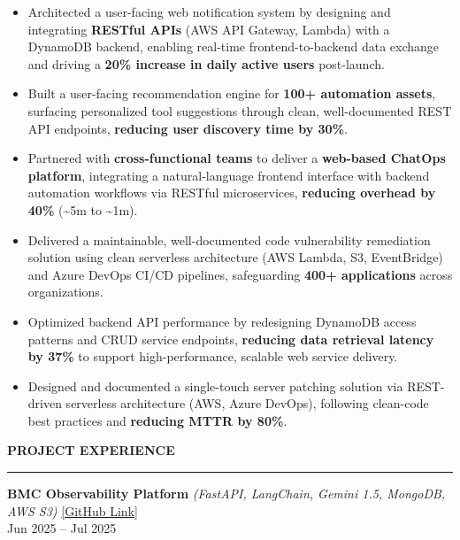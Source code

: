 \documentclass[letterpaper,10.5pt]{extarticle}
\newcommand{\resumesection}[1]{%
    \vspace{6pt}%
    \noindent\textbf{#1}\vspace{-5pt}%
    \\\noindent\rule{\textwidth}{0.5pt}%
    \vspace{1pt}%
}
\begin{document}
\begin{itemize}[leftmargin=12pt, topsep=1pt, itemsep=0pt, parsep=0pt]
    \item Architected a user-facing web notification system by designing and integrating \textbf{RESTful APIs} (AWS API Gateway, Lambda) with a DynamoDB backend, enabling real-time frontend-to-backend data exchange and driving a \textbf{20\% increase in daily active users} post-launch.
    \item Built a user-facing recommendation engine for \textbf{100+ automation assets}, surfacing personalized tool suggestions through clean, well-documented REST API endpoints, \textbf{reducing user discovery time by 30\%}.
    \item Partnered with \textbf{cross-functional teams} to deliver a \textbf{web-based ChatOps platform}, integrating a natural-language frontend interface with backend automation workflows via RESTful microservices, \textbf{reducing overhead by 40\%} (\textasciitilde5m to \textasciitilde1m).
    \item Delivered a maintainable, well-documented code vulnerability remediation solution using clean serverless architecture (AWS Lambda, S3, EventBridge) and Azure DevOps CI/CD pipelines, safeguarding \textbf{400+ applications} across organizations.
    \item Optimized backend API performance by redesigning DynamoDB access patterns and CRUD service endpoints, \textbf{reducing data retrieval latency by 37\%} to support high-performance, scalable web service delivery.
    \item Designed and documented a single-touch server patching solution via REST-driven serverless architecture (AWS, Azure DevOps), following clean-code best practices and \textbf{reducing MTTR by 80\%}.
\end{itemize}

\resumesection{PROJECT EXPERIENCE}

\noindent\textbf{BMC Observability Platform}
\textit{(FastAPI, LangChain, Gemini 1.5, MongoDB, AWS S3)} \hfill \href{https://github.com/slowloris-98/Agentic-Oberservability-BMC}{[GitHub Link]} \\
Jun 2025 -- Jul 2025
\end{document}
